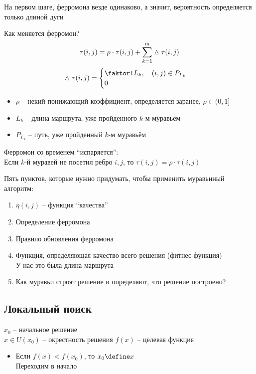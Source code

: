 \begin{note}
	На первом шаге, ферромона везде одинаково, а значит, вероятность определяется только длиной дуги
\end{note}

\begin{undefthm}{Как меняется ферромон?}
    $$ \tau(i, j) = \rho \cdot \tau(i, j) + \sum_{k = 1}^m \vartriangle \tau(i, j) $$
    $$ \vtri \tau(i, j) =
    \begin{cases}
        \faktor1{L_k}, \quad (i, j) \in P_{L_k} \\
        0
    \end{cases} $$
\end{undefthm}

\begin{itemize}
	\item $ \rho $ -- некий понижающий коэффициент, определяется заранее, $ \rho \in (0, 1] $
    \item $ L_k $ -- длина маршрута, уже пройденного $ k $-м муравьём
    \item $ P_{L_k} $ -- путь, уже пройденный $ k $-м муравьём
\end{itemize}

\begin{note}
	Ферромон со временем ``испаряется'': \\
    Если $ k $-й муравей не посетил ребро $ i, j $, то $ \tau(i, j) = \rho \cdot \tau(i, j) $
\end{note}

Пять пунктов, которые нужно придумать, чтобы применить муравьиный алгоритм:
\begin{enumerate}
	\item $ \eta(i, j) $ -- функция ``качества''
    \item Определение ферромона
    \item Правило обновления ферромона
    \item Функция, определяющая качество всего решения (фитнес-функция) \\
    У нас это была длина маршрута
    \item Как муравьи строят решение и определяют, что решение построено?
\end{enumerate}

\subsection{Локальный поиск}

$ x_0 $ -- начальное решение \\
$ x \in U(x_0) $ -- окрестность решения
$ f(x) $ -- целевая функция
\begin{itemize}
	\item Если $ f(x) < f(x_0) $, то $ x_0 \define x $ \\
    Переходим в начало
\end{itemize}

